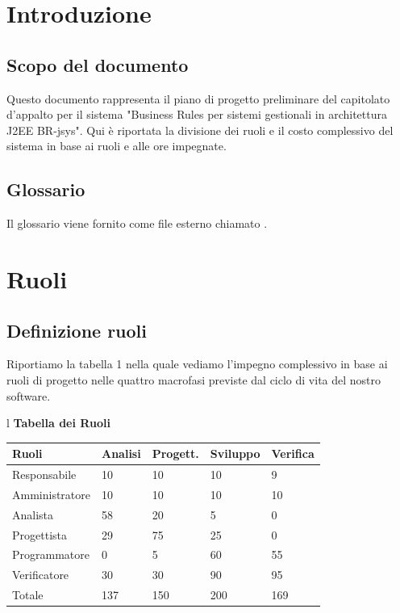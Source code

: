 \documentclass[11pt,titlepage,a4paper]{report}
\begin{document}
\tableofcontents 


\chapter{Introduzione}
\section{Scopo del documento}
Questo documento rappresenta il piano di progetto preliminare
del capitolato d'appalto per il sistema "Business Rules per sistemi
gestionali in architettura J2EE BR-jsys". 
Qui \`e riportata la divisione dei ruoli e il costo complessivo del
sistema in base ai ruoli e alle ore impegnate.

\section{Glossario}
Il glossario viene fornito come file esterno chiamato \Glossario .

\chapter{Ruoli}
\section{Definizione ruoli}
Riportiamo la tabella 1 nella quale vediamo l'impegno
complessivo in base ai ruoli di progetto nelle quattro
macrofasi previste dal ciclo di vita del nostro software.


\begin{table}[hbtp]
\large{
\begin{tabular}{l}
\Large{\textbf{\textsf{Tabella dei Ruoli}}} \\
\begin{tabular}{||p{3cm}||p{2cm}||p{2cm}||p{2cm}||p{2cm}||}
\hline
\textbf{Ruoli} & \textbf{Analisi} & \textbf{Progett.} & \textbf{Sviluppo}
& \textbf{Verifica}\\
\hline
{Responsabile}&10&10&10&9 \\ 
\hline 
{Amministratore} &10&10&10&10\\ 
\hline
{Analista}& 58&20&5&0 \\
\hline
{Progettista}&29&75&25&0 \\
\hline
{Programmatore}&0&5&60&55 \\
\hline
{Verificatore}& 30&30&90&95 \\
\hline
{Totale}& 137&150&200&169 \\
\hline
\end{tabular} \\
\end{tabular}
}

\end{table}
\end{document}
